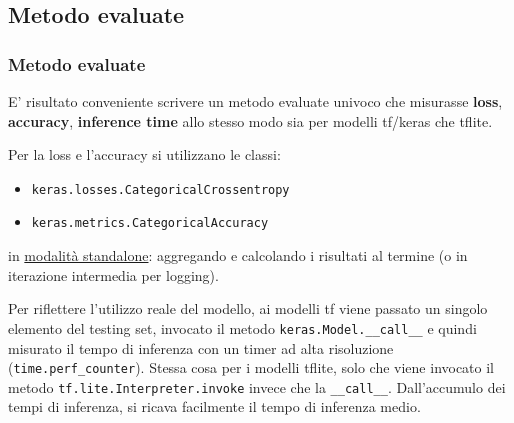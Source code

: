 \documentclass{beamer}
\newcommand{\dflvspace}{\vspace{10pt}}
\begin{document}
\subsection{Metodo evaluate}
\begin{frame}
	\frametitle{Metodo evaluate}
	
	E' risultato conveniente scrivere un metodo evaluate univoco che misurasse \textbf{loss}, \textbf{accuracy}, \textbf{inference time}
	allo stesso modo sia per modelli tf/keras che tflite.
	
	\dflvspace
	
	Per la loss e l'accuracy si utilizzano le classi:
	\begin{itemize}
		\item \texttt{keras.losses.CategoricalCrossentropy}
		\item \texttt{keras.metrics.CategoricalAccuracy}
	\end{itemize}
	in \underline{modalità standalone}: aggregando e calcolando i risultati al termine (o in iterazione intermedia per logging).
	
	\dflvspace
	
	Per riflettere l'utilizzo reale del modello, ai modelli tf viene passato un singolo elemento del testing set,
	invocato il metodo \texttt{keras.Model.\_\_call\_\_} e quindi misurato il tempo di inferenza con un timer ad alta
	risoluzione (\texttt{time.perf\_counter}). Stessa cosa per i modelli tflite, solo che viene invocato il metodo
	\texttt{tf.lite.Interpreter.invoke} invece che la \texttt{\_\_call\_\_}. Dall'accumulo dei tempi di inferenza,
	si ricava facilmente il tempo di inferenza medio.
\end{frame}
\end{document}
